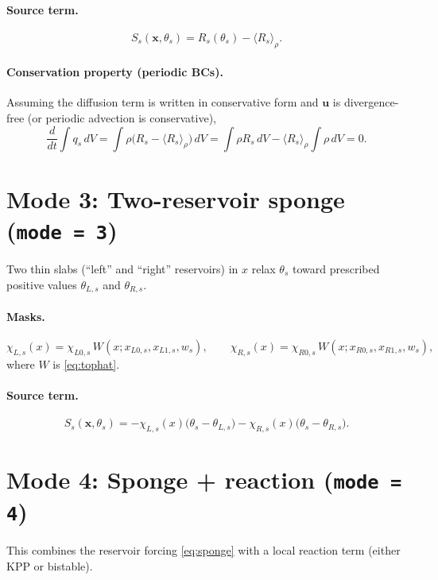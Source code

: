 \paragraph{Source term.}
\begin{equation}
S_s(\mathbf{x},\theta_s) = R_s(\theta_s) - \langle R_s\rangle_\rho.
\label{eq:mcac}
\end{equation}

\paragraph{Conservation property (periodic BCs).}
Assuming the diffusion term is written in conservative form and $\mathbf{u}$ is divergence-free (or periodic advection is conservative),
\[
\frac{d}{dt}\int q_s\,dV
= \int \rho\big(R_s - \langle R_s\rangle_\rho\big)\,dV
= \int \rho R_s\,dV - \langle R_s\rangle_\rho\int \rho\,dV
= 0.
\]

\section*{Mode 3: Two-reservoir sponge (\texttt{mode = 3})}

Two thin slabs (``left'' and ``right'' reservoirs) in $x$ relax $\theta_s$ toward prescribed positive values $\theta_{L,s}$ and $\theta_{R,s}$.

\paragraph{Masks.}
\[
\chi_{L,s}(x)=\chi_{L0,s}\,W(x;x_{L0,s},x_{L1,s},w_s),
\qquad
\chi_{R,s}(x)=\chi_{R0,s}\,W(x;x_{R0,s},x_{R1,s},w_s),
\]
where $W$ is \eqref{eq:tophat}.

\paragraph{Source term.}
\begin{equation}
S_s(\mathbf{x},\theta_s)
= -\chi_{L,s}(x)\big(\theta_s-\theta_{L,s}\big)
  -\chi_{R,s}(x)\big(\theta_s-\theta_{R,s}\big).
\label{eq:sponge}
\end{equation}

\section*{Mode 4: Sponge + reaction (\texttt{mode = 4})}

This combines the reservoir forcing \eqref{eq:sponge} with a local reaction term (either KPP or bistable).

